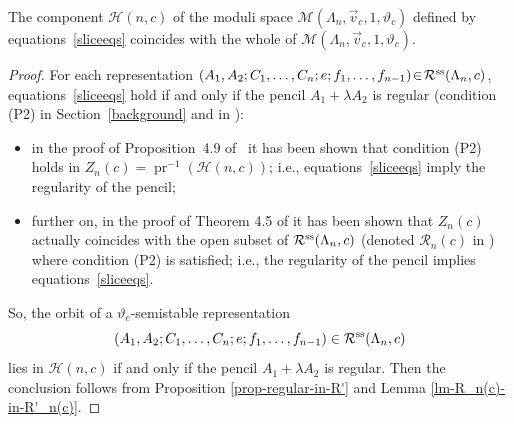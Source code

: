 \begin{Theorem}\label{mainthm} The component $\mathcal{H} (n,c) $ of the moduli
space $\mathcal{M}(\Lambda_n,\vec{v}_c, 1, \vartheta_c)$ defined by equations~\eqref{sliceeqs}
coincides with the whole of $\mathcal{M}(\Lambda_n,\vec{v}_c, 1, \vartheta_c)$.
\end{Theorem}
\begin{proof}For each representation $(A_1,A_2;C_1, \dots,C_n;e;f_1,\dots,f_{n-1}) \!\in\! \mathcal{R}^{\rm ss}(\Lambda_n,c)$, equations~\eqref{sliceeqs} hold if and only if the pencil $A_1 + \lambda A_2$ is regular (condition (P2) in Section~\ref{background} and in \cite{bblr}):
\begin{itemize}\itemsep=0pt
 \item in the proof of Proposition~4.9 of~\cite{bblr} it has been shown that condition (P2) holds in $Z_n(c)=\operatorname{pr}^{-1}(\mathcal{H} (n,c))$; i.e., equations~\eqref{sliceeqs} imply the regularity of the pencil;
 \item further on, in the proof of Theorem 4.5 of \cite{bblr} it has been shown that $Z_n(c)$ actually coincides with the open subset of $\mathcal{R}^{\rm ss}(\Lambda_n,c)$ (denoted $\mathcal{R}_n(c)$ in \cite{bblr}) where condition (P2) is satisfied; i.e., the regularity of the pencil implies equations~\eqref{sliceeqs}.
 \end{itemize}
So, the orbit of a $\vartheta_c$-semistable representation \[(A_1,A_2;C_1, \dots,C_n;e;f_1,\dots,f_{n-1}) \in \mathcal{R}^{\rm ss}(\Lambda_n,c)\] lies in $\mathcal{H}(n,c)$ if and only if the pencil $A_1 + \lambda A_2$ is regular. Then the conclusion follows from Proposition \ref{prop-regular-in-R'} and Lemma \ref{lm-R_n(c)-in-R'_n(c)}.
\end{proof}
